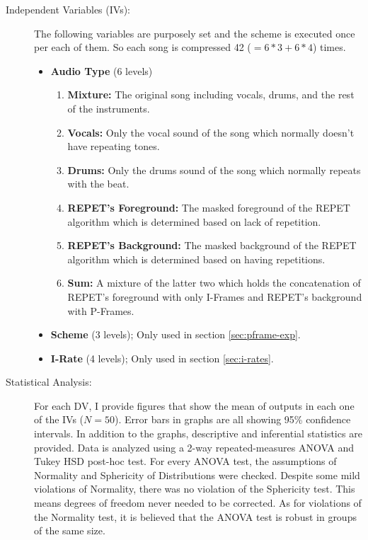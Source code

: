 \begin{description}
\item[Independent Variables (IVs):] The following variables are purposely set and the scheme is executed once per each of them. So each song is compressed 42 ($=6*3 + 6*4$) times.
\begin{itemize}[leftmargin=*]
\item\textbf{Audio Type} (6 levels)
\begin{enumerate}[nosep, leftmargin=*]
\item\textbf{Mixture:} The original song including vocals, drums, and the rest of the instruments.
\item\textbf{Vocals:} Only the vocal sound of the song which normally doesn't have repeating tones.
\item\textbf{Drums:} Only the drums sound of the song which normally repeats with the beat.
\item\textbf{REPET's Foreground:} The masked foreground of the REPET algorithm which is determined based on lack of repetition.
\item\textbf{REPET's Background:} The masked background of the REPET algorithm which is determined based on having repetitions.
\item\textbf{Sum:} A mixture of the latter two which holds the concatenation of REPET's foreground with only I-Frames and REPET's background with P-Frames.
\end{enumerate}
\item\textbf{Scheme} (3 levels); Only used in section \ref{sec:pframe-exp}.
\item\textbf{I-Rate} (4 levels); Only used in section \ref{sec:i-rates}.
\end{itemize}

\item[Statistical Analysis:] For each DV, I provide figures that show the mean of outputs in each one of the IVs ($N=50$). Error bars in graphs are all showing 95\% confidence intervals. In addition to the graphs, descriptive and inferential statistics are provided. Data is analyzed using a 2-way repeated-measures ANOVA and Tukey HSD post-hoc test. For every ANOVA test, the assumptions of Normality and Sphericity of Distributions were checked. Despite some mild violations of Normality, there was no violation of the Sphericity test. This means degrees of freedom never needed to be corrected. As for violations of the Normality test, it is believed that the ANOVA test is robust in groups of the same size.

\end{description}



